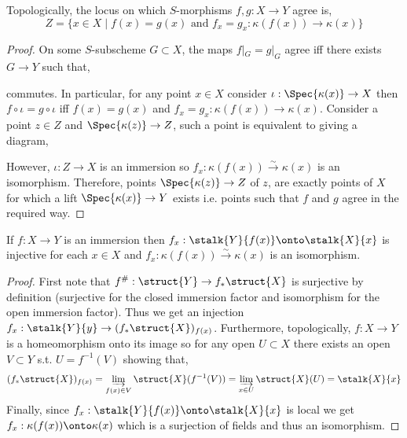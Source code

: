 \documentclass[12pt]{article}
\begin{document}
\begin{lemma}
Topologically, the locus on which $S$-morphisms $f, g : X \to Y$ agree is,
\[ Z = \{ x \in X \mid f(x) = g(x) \text{ and } f_x = g_x : \kappa(f(x)) \to \kappa(x) \} \]
\end{lemma}

\begin{proof}
On some $S$-subscheme $G \subset X$, the maps $f|_G = g|_G$ agree iff there exists $G \to Y$ such that,
\begin{center}
\end{center}
commutes. In particular, for any point $x \in X$ consider $\iota : \Spec{\kappa(x)} \to X$ then $f \circ \iota = g \circ \iota$ iff $f(x) = g(x)$ and $f_x = g_x : \kappa(f(x)) \to \kappa(x)$. Consider a point $z \in Z$ and $\Spec{\kappa(z)} \to Z$, such a point is equivalent to giving a diagram,
\begin{center}
\end{center}
However, $\iota : Z \to X$ is an immersion so $f_x : \kappa(f(x)) \xrightarrow{\sim} \kappa(x)$ is an isomorphism. Therefore, points $\Spec{\kappa(z)} \to Z$ of $z$, are exactly points of $X$ for which a lift $\Spec{\kappa(x)} \to Y$ exists i.e. points such that $f$ and $g$ agree in the required way.
\end{proof}

\begin{lemma}
If $f : X \to Y$ is an immersion then $f_x : \stalk{Y}{f(x)} \onto \stalk{X}{x}$ is injective for each $x \in X$ and $f_x : \kappa(f(x)) \xrightarrow{\sim} \kappa(x)$ is an isomorphism.
\end{lemma}

\begin{proof}
First note that $f^{\#} : \struct{Y} \to f_* \struct{X}$ is surjective by definition (surjective for the closed immersion factor and isomorphism for the open immersion factor). Thus we get an injection $f_x : \stalk{Y}{y} \to (f_* \struct{X})_{f(x)}$. Furthermore, topologically, $f : X \to Y$ is a homeomorphism onto its image so for any open $U \subset X$ there exists an open $V \subset Y$ s.t. $U = f^{-1}(V)$ showing that,
\[ (f_* \struct{X})_{f(x)} = \varinjlim_{f(x) \in V} \struct{X}(f^{-1}(V)) = \varinjlim_{x \in U} \struct{X}(U) = \stalk{X}{x} \]
Finally, since $f_x : \stalk{Y}{f(x)} \onto \stalk{X}{x}$ is local we get $f_x : \kappa(f(x)) \onto \kappa(x)$ which is a surjection of fields and thus an isomorphism. 
\end{proof}
\end{document}
